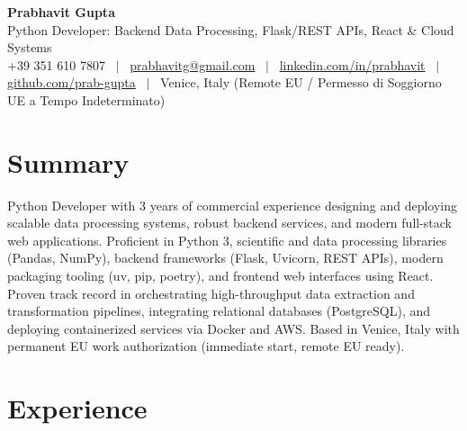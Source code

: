 \documentclass[a4paper,10pt]{article}
\begin{document}
\begin{minipage}[c]{0.80\textwidth}
  {\Huge\bfseries Prabhavit Gupta}\\[3pt]
  {\color{accent}\large Python Developer: Backend Data Processing, Flask/REST APIs, React \& Cloud Systems}\\[6pt]
  {\footnotesize +39 351 610 7807 ~$\vert$~
  \href{mailto:prabhavitg@gmail.com}{prabhavitg@gmail.com} ~$\vert$~
  \href{https://www.linkedin.com/in/prabhavit/}{linkedin.com/in/prabhavit} ~$\vert$~
  \href{https://github.com/prab-gupta}{github.com/prab-gupta} ~$\vert$~
  Venice, Italy (Remote EU / Permesso di Soggiorno UE a Tempo Indeterminato)}
\end{minipage}\hfill

\section{Summary}
Python Developer with 3 years of commercial experience designing and deploying scalable data processing systems, robust backend services, and modern full-stack web applications. Proficient in Python 3, scientific and data processing libraries (Pandas, NumPy), backend frameworks (Flask, Uvicorn, REST APIs), modern packaging tooling (uv, pip, poetry), and frontend web interfaces using React. Proven track record in orchestrating high-throughput data extraction and transformation pipelines, integrating relational databases (PostgreSQL), and deploying containerized services via Docker and AWS. Based in Venice, Italy with permanent EU work authorization (immediate start, remote EU ready).

\section{Experience}
\end{document}
